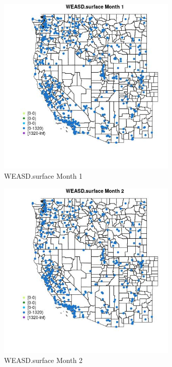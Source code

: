 \begin{figure} 
\centering  
\includegraphics[width=0.77\textwidth]{Code_Outputs/Report_ML_input_PM25_Step4_part_e_de_duplicated_aves_compiled_2019-05-18wNAs_MapObsMo1WEASDsurface.jpg} 
\caption{\label{fig:Report_ML_input_PM25_Step4_part_e_de_duplicated_aves_compiled_2019-05-18wNAsMapObsMo1WEASDsurface}WEASD.surface Month 1} 
\end{figure} 
 

\begin{figure} 
\centering  
\includegraphics[width=0.77\textwidth]{Code_Outputs/Report_ML_input_PM25_Step4_part_e_de_duplicated_aves_compiled_2019-05-18wNAs_MapObsMo2WEASDsurface.jpg} 
\caption{\label{fig:Report_ML_input_PM25_Step4_part_e_de_duplicated_aves_compiled_2019-05-18wNAsMapObsMo2WEASDsurface}WEASD.surface Month 2} 
\end{figure} 
 

